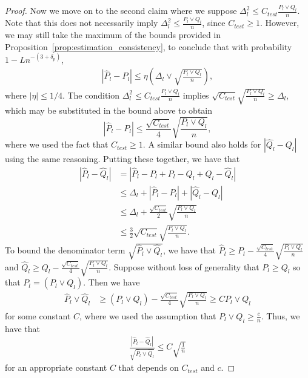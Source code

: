 \documentclass{article}
\begin{document}
\begin{proof}
Now we move on to the second claim where we suppose $\Delta_l^2 \leq C_{test} \frac{P_l \vee Q_l}{n}$. Note that this does not necessarily imply  $\Delta_l^2 \leq  \frac{P_l \vee Q_l}{n}$, since $C_{test} \geq 1$. However, we may still take the maximum of the bounds provided in Proposition~\ref{prop:estimation_consistency}, to conclude that with probability $1 - L n^{-(3+\delta_p)}$,
\begin{align*}
|\hat{P}_l - P_l| \leq \eta \left( \Delta_l \vee \sqrt{\frac{P_l \vee Q_l}{n} } \right),
\end{align*}
where $|\eta| \leq 1/4$. The condition $\Delta_l^2 \leq C_{test} \frac{P_l \vee Q_l}{n}$ implies $\sqrt{C_{test}}\sqrt{ \frac{P_l \vee Q_l}{n}} \geq \Delta_l$, which may be substituted in the bound above to obtain
\[
| \hat{P}_l - P_l | \leq \frac{\sqrt{C_{test}}}{4}\sqrt{ \frac{P_l \vee Q_l}{n} }, 
\]
where we used the fact that $C_{test} \geq 1.$ A similar bound also holds for $|\hat{Q}_l - Q_l|$ using the same reasoning. Putting these together, we have that
\begin{align*}
|\hat{P}_l - \hat{Q}_l| &= | \hat{P}_l - P_l + P_l - Q_l + Q_l - \hat{Q}_l| \\
    &\leq \Delta_l + | \hat{P}_l - P_l| + |\hat{Q}_l - Q_l| \\
    &\leq \Delta_l + \frac{\sqrt{C_{test}}}{2} \sqrt{ \frac{P_l \vee Q_l}{n} } \\
    &\leq \frac{3}{2} \sqrt{C_{test}} \sqrt{ \frac{P_l \vee Q_l}{n} }.
\end{align*}
To bound the denominator term $\sqrt{ \hat{P}_l \vee \hat{Q}_l}$, we have that $\hat{P}_l \geq P_l - \frac{\sqrt{C_{test}}}{4}\sqrt{ \frac{P_l \vee Q_l}{n} }$ and $\hat{Q}_l \geq Q_l - \frac{\sqrt{C_{test}}}{4} \sqrt{ \frac{P_l \vee Q_l}{n}}$. Suppose without loss of generality that $P_l \geq Q_l$ so that $P_l = (P_l \vee Q_l)$. Then we have
\begin{align*}
\hat{P}_l \vee \hat{Q}_l &\geq (P_l \vee Q_l) - \frac{\sqrt{C_{test}}}{4} \sqrt{ \frac{P_l \vee Q_l}{n}} \geq C P_l \vee Q_l
\end{align*} 
for some constant $C$, where we used the assumption that $P_l \vee Q_l \geq \frac{c}{n}$. Thus, we have that
\begin{align*}
\frac{| \hat{P}_l - \hat{Q}_l| }{\sqrt{ \hat{P}_l \vee \hat{Q}_l} } \leq C \sqrt{ \frac{1}{n} }
\end{align*}
for an appropriate constant $C$ that depends on $C_{test}$ and $c$.
\end{proof}
\end{document}
